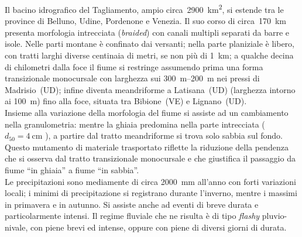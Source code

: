 Il bacino idrografico del Tagliamento, ampio circa~\SI{2900}{\kilo\m\tothe{2}}, si estende tra le province di Belluno, Udine, Pordenone e Venezia.
Il suo corso di circa~\SI{170}{\kilo\m} presenta morfologia intrecciata (\emph{braided}) con canali multipli separati da barre e isole.
Nelle parti montane è confinato dai versanti; 
nella parte planiziale è libero, con tratti larghi diverse centinaia di metri, se non più di \SI{1}{\kilo\m};
a qualche decina di chilometri dalla foce il fiume si restringe assumendo prima una forma transizionale monocursale con larghezza sui \SIrange[range-phrase={-}]{300}{200}{\m} nei pressi di Madrisio~(UD);
infine diventa meandriforme a Latisana~(UD) (larghezza intorno ai \SI{100}{\m}) fino alla foce, situata tra Bibione~(VE) e Lignano~(UD).
\\
Insieme alla variazione della morfologia del fiume si assiste ad un cambiamento nella granulometria: mentre la ghiaia predomina nella parte intrecciata ($d_{50} = \SI{4}{\centi\m}$ ), a partire dal tratto meandriforme si trova solo sabbia sul fondo.
Questo mutamento di materiale trasportato riflette la riduzione della pendenza che si osserva dal tratto transizionale monocursale e che giustifica il passaggio da fiume “in ghiaia” a fiume “in sabbia”.
\\
Le precipitazioni sono mediamente di circa \SI{2000}{\mm} all'anno con forti variazioni locali; i minimi di precipitazione si registrano durante l'inverno, mentre i massimi in primavera e in autunno.
Si assiste anche ad eventi di breve durata e particolarmente intensi.
Il regime fluviale che ne risulta è di tipo \emph{flashy} pluvio-nivale, con piene brevi ed intense, oppure con piene di diversi giorni di durata.


